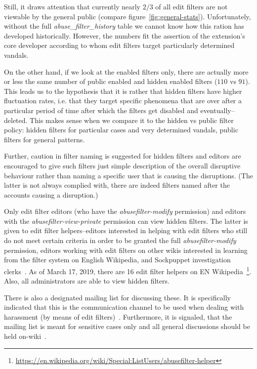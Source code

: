 Still, it draws attention that currently nearly $2/3$ of all edit filters are not viewable by the general public (compare figure~\ref{fig:general-stats}).
Unfortunately, without the full \emph{abuse\_filter\_history} table we cannot know how this ration has developed historically.
However, the numbers fit the assertion of the extension's core developer according to whom edit filters target particularly determined vandals.

On the other hand, if we look at the enabled filters only, there are actually more or less the same number of public enabled and hidden enabled filters ($110$ vs $91$).
This leads us to the hypothesis that it is rather that hidden filters have higher fluctuation rates, i.e. that they target specific phenomena that are over after a particular period of time after which the filters get disabled and eventually–deleted.
This makes sense when we compare it to the hidden vs public filter policy: hidden filters for particular cases and very determined vandals, public filters for general patterns.


Further, caution in filter naming is suggested for hidden filters and editors are encouraged to give such filters just simple description of the overall disruptive behaviour rather than naming a specific user that is causing the disruptions.
(The latter is not always complied with, there are indeed filters named after the accounts causing a disruption.)

Only edit filter editors (who have the \emph{abusefilter-modify} permission) and editors with the \emph{abusefilter-view-private} permission can view hidden filters.
The latter is given to edit filter helpers–editors interested in helping with edit filters who still do not meet certain criteria in order to be granted the full \emph{abusefilter-modify} permission, editors working with edit filters on other wikis interested in learning from the filter system on English Wikipedia, and Sockpuppet investigation clerks~\cite{Wikipedia:EditFilterHelper}.
As of March 17, 2019, there are 16 edit filter helpers on EN Wikipedia~\footnote{\url{https://en.wikipedia.org/wiki/Special:ListUsers/abusefilter-helper}}.
Also, all administrators are able to view hidden filters.

There is also a designated mailing list for discussing these.
It is specifically indicated that this is the communication channel to be used when dealing with harassment (by means of edit filters)~\cite{Wikipedia:EditFilter}.
Furthermore, it is signaled, that the mailing list is meant for sensitive cases only and all general discussions should be held on-wiki~\cite{Wikipedia:EditFilter}.


